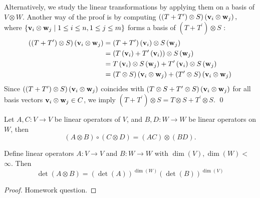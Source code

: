 \noindent Alternatively, we study the linear transformations by applying them on a basis of $V \otimes W$. Another way of the proof is by computing
\(\left( {\left( {T + {T}^{\prime }}\right)  \otimes  S}\right) \left( {{\bf v}_{i} \otimes  {\bf w}_{j}}\right),
\)
where \(\left\{  {{\bf v}_{i} \otimes  {\bf w}_{j} \mid  1 \leq  i \leq  n,1 \leq  j \leq  m}\right\}\) forms a basis of \(\left( {T + {T}^{\prime }}\right)  \otimes  S\) :
\begin{align*}
\left( {\left( {T + {T}^{\prime }}\right)  \otimes  S}\right) \left( {{\bf v}_{i} \otimes  {\bf w}_{j}}\right)  &= \left( {T + {T}^{\prime }}\right) \left( {\bf v}_{i}\right)  \otimes  S\left( {\bf w}_{j}\right)
\\
&= \left( {T\left( {\bf v}_{i}\right)  + {T}^{\prime }\left( {\bf v}_{i}\right) }\right)  \otimes  S\left( {\bf w}_{j}\right)
\\
&= T\left( {\bf v}_{i}\right)  \otimes  S\left( {\bf w}_{j}\right)  + {T}^{\prime }\left( {\bf v}_{i}\right)  \otimes  S\left( {\bf w}_{j}\right)
\\
&= \left( {T \otimes  S}\right) \left( {{\bf v}_{i} \otimes  {\bf w}_{j}}\right)  + \left( {{T}^{\prime } \otimes  S}\right) \left( {{\bf v}_{i} \otimes  {\bf w}_{j}}\right)
\end{align*}
Since \(\left( {\left( {T + {T}^{\prime }}\right)  \otimes  S}\right) \left( {{\bf v}_{i} \otimes  {\bf w}_{j}}\right)\) coincides with \(\left( {T \otimes  S + {T}^{\prime } \otimes  S}\right) \left( {{\bf v}_{i} \otimes  {\bf w}_{j}}\right)\) for all basis vectors \({\bf v}_{i} \otimes  {\bf w}_{j} \in  C\), we imply
\(\left( {T + {T}^{\prime }}\right)  \otimes  S = T \otimes  S + {T}^{\prime } \otimes  S 
\).
\qed

\begin{proposition}
Let \(A,C: V \to V\) be linear operators of \(V\), and \(B,D: W \to W\) be linear operators on \(W\), then
\[
\left( {A \otimes  B}\right)  \circ  \left( {C \otimes  D}\right)  = \left( {AC}\right)  \otimes  \left( {BD}\right).
\] 
\end{proposition}

\begin{proposition}
Define linear operators \(A : V \rightarrow  V\) and \(B : W \rightarrow  W\) with \(\dim \left( V\right) ,\dim \left( W\right)  <\)  \(\infty\). Then
\[
\det \left( {A \otimes  B}\right)  = {\left( \det \left( A\right) \right) }^{\dim \left( W\right) }{\left( \det \left( B\right) \right) }^{\dim \left( V\right) }
\]
\end{proposition} 
\begin{proof}
    Homework question.
\end{proof}

